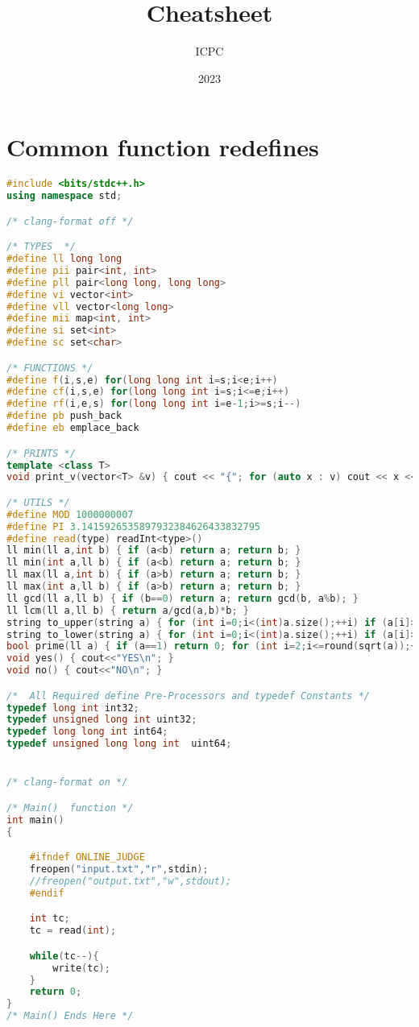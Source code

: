 \documentclass{article}
\title{Cheatsheet}
\date{2023}
\author{ICPC}
\begin{document}
\maketitle
\section{Common function redefines}
\lstset {    language=C++,
    basicstyle=\small\ttfamily,
    numbers=left,
    breaklines=true,
    tabsize=4}
\begin{lstlisting}[linewidth=\columnwidth,breaklines=true,language=C++]
#include <bits/stdc++.h>
using namespace std;

/* clang-format off */

/* TYPES  */
#define ll long long
#define pii pair<int, int>
#define pll pair<long long, long long>
#define vi vector<int>
#define vll vector<long long>
#define mii map<int, int>
#define si set<int>
#define sc set<char>

/* FUNCTIONS */
#define f(i,s,e) for(long long int i=s;i<e;i++)
#define cf(i,s,e) for(long long int i=s;i<=e;i++)
#define rf(i,e,s) for(long long int i=e-1;i>=s;i--)
#define pb push_back
#define eb emplace_back

/* PRINTS */
template <class T>
void print_v(vector<T> &v) { cout << "{"; for (auto x : v) cout << x << ","; cout << "\b}"; }

/* UTILS */
#define MOD 1000000007
#define PI 3.1415926535897932384626433832795
#define read(type) readInt<type>()
ll min(ll a,int b) { if (a<b) return a; return b; }
ll min(int a,ll b) { if (a<b) return a; return b; }
ll max(ll a,int b) { if (a>b) return a; return b; }
ll max(int a,ll b) { if (a>b) return a; return b; }
ll gcd(ll a,ll b) { if (b==0) return a; return gcd(b, a%b); }
ll lcm(ll a,ll b) { return a/gcd(a,b)*b; }
string to_upper(string a) { for (int i=0;i<(int)a.size();++i) if (a[i]>='a' && a[i]<='z') a[i]-='a'-'A'; return a; }
string to_lower(string a) { for (int i=0;i<(int)a.size();++i) if (a[i]>='A' && a[i]<='Z') a[i]+='a'-'A'; return a; }
bool prime(ll a) { if (a==1) return 0; for (int i=2;i<=round(sqrt(a));++i) if (a%i==0) return 0; return 1; }
void yes() { cout<<"YES\n"; }
void no() { cout<<"NO\n"; }

/*  All Required define Pre-Processors and typedef Constants */
typedef long int int32;
typedef unsigned long int uint32;
typedef long long int int64;
typedef unsigned long long int  uint64;


/* clang-format on */

/* Main()  function */
int main()
{

	#ifndef ONLINE_JUDGE
	freopen("input.txt","r",stdin);
	//freopen("output.txt","w",stdout);
	#endif

	int tc;
	tc = read(int);

	while(tc--){
		write(tc);
	}
	return 0;
}
/* Main() Ends Here */
\end{lstlisting}
\end{document}
